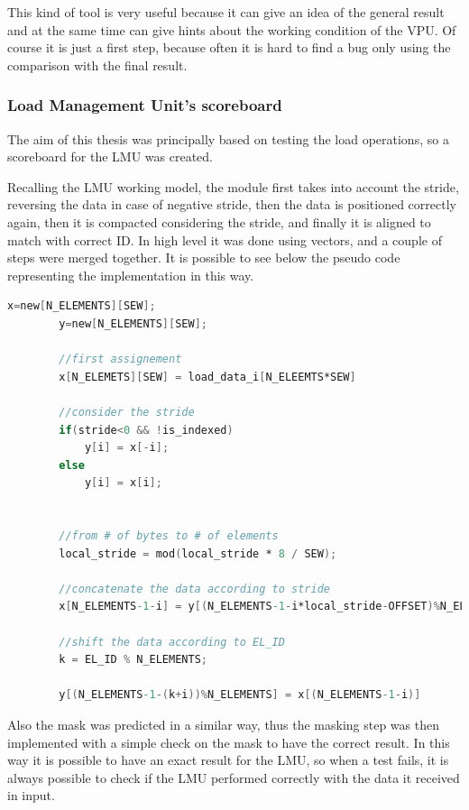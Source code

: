 This kind of tool is very useful because it can give an idea of the general result and at the same time can give hints about the working condition of the VPU. Of course it is just a first step, because often it is hard to find a bug only using the comparison with the final result.

\subsubsection{Load Management Unit's scoreboard}
The aim of this thesis was principally based on testing the load operations, so a scoreboard for the LMU was created.

Recalling the LMU working model, the module first takes into account the stride, reversing the data in case of negative stride, then the data is positioned correctly again, then it is compacted considering the stride, and finally it is aligned to match with correct ID.
In high level it was done using vectors, and a couple of steps were merged together. It is possible to see below the pseudo code representing the implementation in this way.

\linespread{1}
\begin{lstlisting}[language=Verilog,style=verilog-style, backgroundcolor=\color{lyel_palette}, frame=tlb]
        x=new[N_ELEMENTS][SEW];
        y=new[N_ELEMENTS][SEW];

        //first assignement
        x[N_ELEMETS][SEW] = load_data_i[N_ELEEMTS*SEW]

        //consider the stride
        if(stride<0 && !is_indexed)
            y[i] = x[-i];
        else
            y[i] = x[i];
        

        //from # of bytes to # of elements
        local_stride = mod(local_stride * 8 / SEW);

        //concatenate the data according to stride 
        x[N_ELEMENTS-1-i] = y[(N_ELEMENTS-1-i*local_stride-OFFSET)%N_ELEMENTS];

        //shift the data according to EL_ID
        k = EL_ID % N_ELEMENTS;
        
        y[(N_ELEMENTS-1-(k+i))%N_ELEMENTS] = x[(N_ELEMENTS-1-i)]
\end{lstlisting}
\linespread{1.2}

Also the mask was predicted in a similar way, thus the masking step was then implemented with a simple check on the mask to have the correct result.
In this way it is possible to have an exact result for the LMU, so when a test fails, it is always possible to check if the LMU performed correctly with the data it received in input.

